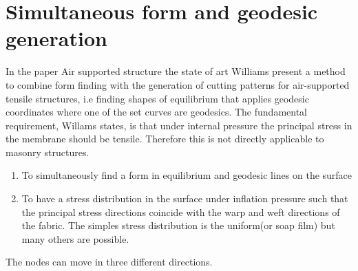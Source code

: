 \section{Simultaneous form and geodesic generation}

In the paper Air supported structure the state of art Williams present a method to combine form finding with the generation of cutting patterns for air-supported tensile structures, i.e finding shapes of equilibrium that applies geodesic coordinates where one of the set curves are geodesics. The fundamental requirement, Willams states, is that under internal pressure the principal stress in the membrane should be tensile. Therefore this is not directly applicable to masonry structures.

\vspace{5mm}
\begin{enumerate}
\item To simultaneously find a form in equilibrium and geodesic lines on the surface
\item To have a stress distribution in the surface under inflation pressure such that the principal stress directions coincide with the warp and weft directions of the fabric. The simples stress distribution is the uniform(or soap film) but many others are possible.
\end{enumerate}
\vspace{5mm}
The nodes can move in three different directions.
